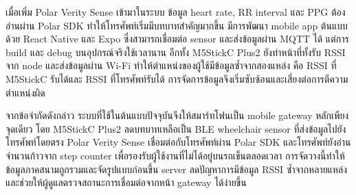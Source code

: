 เมื่อเพิ่ม Polar Verity Sense เข้ามาในระบบ ข้อมูล heart rate, RR interval และ PPG ต้องอ่านผ่าน Polar SDK ทำให้โทรศัพท์เริ่มมีบทบาทสำคัญมากขึ้น มีการพัฒนา mobile app ต้นแบบด้วย React Native และ Expo ซึ่งสามารถเชื่อมต่อ sensor และส่งข้อมูลผ่าน MQTT ได้ แต่การ build และ debug บนอุปกรณ์จริงใช้เวลานาน อีกทั้ง M5StickC Plus2 ยังทำหน้าที่ทั้งรับ RSSI จาก node และส่งข้อมูลผ่าน Wi-Fi ทำให้ตำแหน่งของผู้ใช้มีข้อมูลซ้ำจากสองแหล่ง คือ RSSI ที่ M5StickC รับได้และ RSSI ที่โทรศัพท์รับได้ การจัดการข้อมูลจึงเริ่มซับซ้อนและเสี่ยงต่อการตีความตำแหน่งผิด

จากข้อจำกัดดังกล่าว ระบบที่ใช้ในต้นแบบปัจจุบันจึงให้สมาร์ทโฟนเป็น mobile gateway หลักเพียงจุดเดียว โดย M5StickC Plus2 ลดบทบาทเหลือเป็น BLE wheelchair sensor ที่ส่งข้อมูลไปยังโทรศัพท์โดยตรง Polar Verity Sense เชื่อมต่อกับโทรศัพท์ผ่าน Polar SDK และโทรศัพท์ยังอ่านจำนวนก้าวจาก step counter เพื่อรองรับผู้ใช้งานที่ไม่ได้อยู่บนรถเข็นตลอดเวลา การจัดวางนี้ทำให้ข้อมูลภาคสนามถูกรวมและจัดรูปแบบก่อนขึ้น server ลดปัญหาการมีข้อมูล RSSI ซ้ำจากหลายแหล่ง และช่วยให้ผู้ดูแลตรวจสถานะการเชื่อมต่อจากหน้า gateway ได้ง่ายขึ้น


